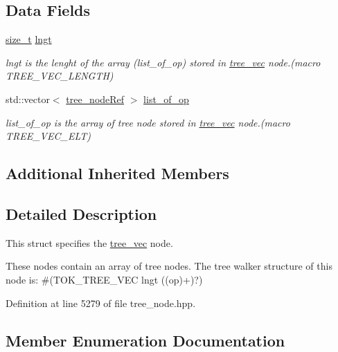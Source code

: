 \subsection*{Data Fields}
\begin{DoxyCompactItemize}
\item 
\hyperlink{tutorial__fpt__2017_2intro_2sixth_2test_8c_a7c94ea6f8948649f8d181ae55911eeaf}{size\+\_\+t} \hyperlink{structtree__vec_a8edb7c8b48f7d0959584d92bc2c4385d}{lngt}
\begin{DoxyCompactList}\small\item\em lngt is the lenght of the array (list\+\_\+of\+\_\+op) stored in \hyperlink{structtree__vec}{tree\+\_\+vec} node.(macro T\+R\+E\+E\+\_\+\+V\+E\+C\+\_\+\+L\+E\+N\+G\+TH) \end{DoxyCompactList}\item 
std\+::vector$<$ \hyperlink{tree__node_8hpp_a6ee377554d1c4871ad66a337eaa67fd5}{tree\+\_\+node\+Ref} $>$ \hyperlink{structtree__vec_a3e6650d6f47251f64184c33b199064f8}{list\+\_\+of\+\_\+op}
\begin{DoxyCompactList}\small\item\em list\+\_\+of\+\_\+op is the array of tree node stored in \hyperlink{structtree__vec}{tree\+\_\+vec} node.(macro T\+R\+E\+E\+\_\+\+V\+E\+C\+\_\+\+E\+LT) \end{DoxyCompactList}\end{DoxyCompactItemize}
\subsection*{Additional Inherited Members}


\subsection{Detailed Description}
This struct specifies the \hyperlink{structtree__vec}{tree\+\_\+vec} node. 

These nodes contain an array of tree nodes. The tree walker structure of this node is\+: \#(T\+O\+K\+\_\+\+T\+R\+E\+E\+\_\+\+V\+EC lngt ((op)+)?) 

Definition at line 5279 of file tree\+\_\+node.\+hpp.



\subsection{Member Enumeration Documentation}
\mbox{\label{structtree__vec_af85c857ad38740884cb1ffcf64f981eb}} 
